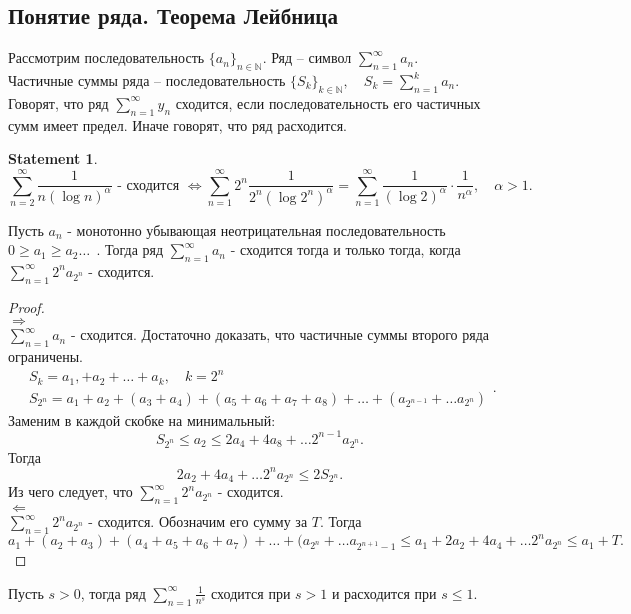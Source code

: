 \documentclass[11pt]{book}
\newcommand{\N}{\mathbb{N}}
\newcommand{\slim}{\sum\limits}
\renewcommand{\le}{\leqslant}
\renewcommand{\ge}{\geqslant}
\theoremstyle{definition}
\theoremstyle{plain}
\theoremstyle{plain}
\newtheorem*{st}{Statement}
\theoremstyle{definition}
\theoremstyle{remark}
\begin{document}
\subsection{Понятие ряда. Теорема Лейбница}\label{ques_26}
\begin{defn}
    Рассмотрим последовательность $\{a_n\}_{n \in  \N}$. Ряд -- символ $\slim_{n=1}^{\infty}a_n$.\\
    Частичные суммы ряда -- последовательность $\{S_k\}_{k \in \N}, \quad S_k = \slim_{n = 1}^k a_n$.\\
    Говорят, что ряд $\slim_{n = 1}^\infty{y_n}$ сходится, если последовательность его частичных сумм имеет предел. Иначе  говорят, что ряд расходится.
\end{defn}
\begin{st}
    \[
	\slim_{n=2}^\infty \frac{1}{n(\log n)^\alpha } \mbox{ - сходится } \Longleftrightarrow \slim_{n=1}^\infty 2^n \frac{1}{2^n (\log 2^n )^\alpha } = \slim_{n=1}^\infty \frac{1}{(\log 2)^\alpha }\cdot \frac{1}{n^\alpha }, \quad \alpha  > 1
    .\] 
\end{st}
\begin{thm}[Лейбниц]
    Пусть $a_n$ - монотонно убывающая неотрицательная последовательность $0 \ge  a_1 \ge a_2 \ldots ~~$. Тогда ряд $\slim_{n=1}^{\infty} a_n$ - сходится тогда и только тогда, 
    когда 
    $\slim_{n=1}^{\infty} {2^n a_{2^n}}$ - сходится.
\end{thm}
\begin{proof}
	$ $ \\$ \Rightarrow  $\\
	    $\slim_{n=1}^\infty a_n $ - сходится. Достаточно доказать, что частичные суммы второго ряда ограничены.\[
		\begin{array}{l}
	    S_k = a_1, + a_2 + \ldots +a_k, \quad k = 2^n\\
	    S_{2^n} = a_1 + a_2 + (a_3+a_4) + (a_5+a_6+a_7+a_8) + \ldots +(a_{2^{n-1}} + \ldots a_{2^n} ) 
		\end{array}
	    .\] 
	    Заменим в каждой скобке на минимальный:
	    \[
		S_{2^n} \le a_2 \le 2 a_4 + 4 a_8 + \ldots 2^{n-1} a_{2^n}
	    .\] 
	    Тогда  \[
		2 a_2 + 4 a_4 + \ldots 2^n a_{2^n} \le 2 S_{2^n}
	    .\] 
	    Из чего следует, что $\slim_{n=1}^{\infty} {2^n a_{2^n}}$ - сходится.
	\\$ \Leftarrow $\\
	$\slim_{n=1}^{\infty} {2^n a_{2^n}}$ - сходится. Обозначим его сумму за $T$. Тогда 
	\[
	    a_1+(a_2+a_3) + (a_4+a_5+a_6+a_7) + \ldots +(a_{2^n} + \ldots a_{2^{n+1} -1} \le a_1 + 2 a_2 +4 a_4 + \ldots 2^n a_{2^n} \le a_1 +T
	.\] 
\end{proof}
\begin{thm}
    Пусть $s>0$, тогда ряд $\slim_{n=1}^\infty \frac{1}{n^s}$ сходится при $s > 1$ и расходится при $s \le 1$.
\end{thm}
\end{document}
